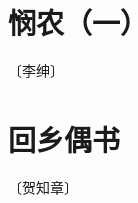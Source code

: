 \documentclass[12pt,UTF-8,openany]{ctexbook}
\begin{document}
\vspace{8pt}


\section{悯农（一）}

\begin{center}
    \vspace{10pt}
    
    \begin{normalsize}
        
        〔李绅〕
        
    \end{normalsize}
    
    \vspace{8pt}
    
    \begin{large}
        
        
        
    \end{large}
    
\end{center}

\vspace{8pt}


\section{回乡偶书}

\begin{center}
    \vspace{10pt}
    
    \begin{normalsize}
        
        〔贺知章〕
        
    \end{normalsize}
    
    \vspace{8pt}
    
    \begin{large}
        
        
        
    \end{large}
    
\end{center}
\end{document}
